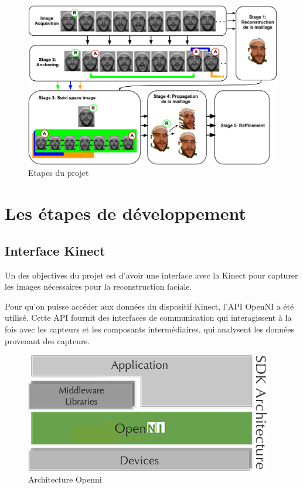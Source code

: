 \documentclass[a4paper,12pt]{article}
\begin{document}
\begin{figure}[ht!]
  \begin{center}
    \includegraphics[scale=0.4]{img/projDiagram.png}
    \caption{Etapes du projet}
  \end{center}
\end{figure}



\section{Les étapes de développement}
\subsection*{Interface Kinect}

Un des objectives du projet est d’avoir une interface avec la Kinect
pour capturer les images nécessaires pour la reconstruction faciale.

Pour qu’on puisse accéder aux données du dispositif Kinect, l’API
OpenNI\cite{Openni2010} a été utilisé. Cette API fournit des
interfaces de communication qui interagissent à la fois avec les
capteurs et les composants intermédiaires, qui analysent les données
provenant des capteurs.

\begin{figure}[h!]
  \begin{center}
    \includegraphics[scale=0.4]{img/image03.png}
    \caption{Architecture Openni}
  \end{center}
\end{figure}
\end{document}
